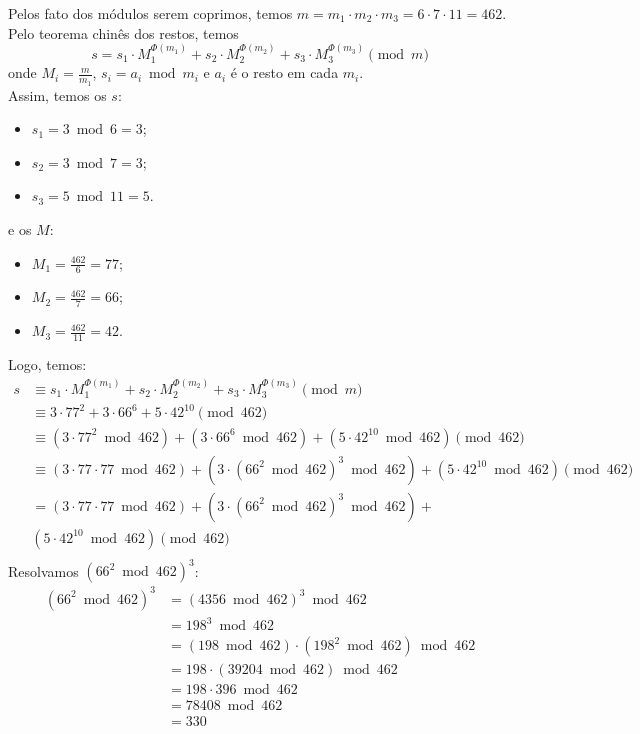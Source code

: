 Pelos fato dos módulos serem coprimos, temos $m = m_1 \cdot m_2 \cdot m_3 = 6 \cdot 7 \cdot 11 = 462$. \\
Pelo teorema chinês dos restos, temos 
\begin{displaymath}
	s = s_1 \cdot M_1^{\Phi(m_1)} + s_2 \cdot M_2^{\Phi(m_2)} + s_3 \cdot M_3^{\Phi(m_3)} \pmod{m}
\end{displaymath}
onde $M_i = \frac{m}{m_1}$, $s_i = a_i \bmod{m_i}$ e $a_i$ é o resto em cada $m_i$. \\ 
Assim, temos os $s$:
\begin{itemize}
	\item $s_1 = 3 \bmod{6} = 3$;
	\item $s_2 = 3 \bmod{7} = 3$;
	\item $s_3 = 5 \bmod{11} = 5$.
\end{itemize}
e os $M$:
\begin{itemize}
	\item $M_1 = \frac{462}{6} = 77$;
	\item $M_2 = \frac{462}{7} = 66$;
	\item $M_3 = \frac{462}{11} = 42$.
\end{itemize}
Logo, temos:
\begin{align*}
	s &\equiv s_1 \cdot M_1^{\Phi(m_1)} + s_2 \cdot M_2^{\Phi(m_2)} + s_3 \cdot M_3^{\Phi(m_3)} \pmod{m} \\
	&\equiv 3 \cdot 77^2 + 3 \cdot 66^6 + 5 \cdot 42^{10} \pmod{462} \\
	&\equiv (3 \cdot 77^2 \bmod{462}) + (3 \cdot 66^6 \bmod{462}) + (5 \cdot 42^{10} \bmod{462}) \pmod{462} \\
	&\equiv (3 \cdot 77 \cdot 77 \bmod{462}) + (3 \cdot (66^2 \bmod{462})^3 \bmod{462}) + (5 \cdot 42^{10} \bmod{462}) \pmod{462} \\
	&= (3 \cdot 77 \cdot 77 \bmod{462}) + (3 \cdot (66^2 \bmod{462})^3 \bmod{462}) + \\& (5 \cdot 42^{10} \bmod{462}) \pmod{462} \\
\end{align*}
Resolvamos $(66^2 \bmod{462})^3$:
\begin{align*}
	(66^2 \bmod{462})^3 &= (4356 \bmod{462})^3 \bmod{462} \\
	&= 198^3 \bmod{462} \\
	&= (198 \bmod{462}) \cdot (198^2 \bmod{462}) \bmod{462} \\
	&= 198 \cdot (39204 \bmod{462}) \bmod{462} \\
	&= 198 \cdot 396 \bmod{462} \\
	&= 78408 \bmod{462} \\
	&= 330 \\
\end{align*}
